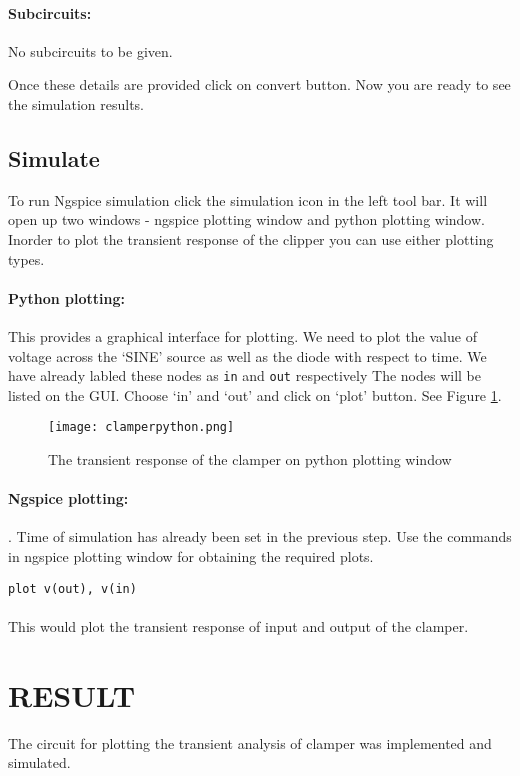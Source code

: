 \paragraph{Subcircuits:} No subcircuits to be given.

\noindent Once these details are provided click on convert button.  Now you are ready to see the simulation results.


\paragraph{}
\subsection*{Simulate} To run Ngspice simulation click the simulation icon in the left tool bar. It will open up two windows - ngspice plotting window and python plotting window. Inorder to plot the transient response of the clipper you can use either plotting types.

\paragraph{Python plotting:}This provides a graphical interface for plotting. We need to plot the value of voltage across the `SINE' source as well as the diode with respect to time. We have already labled these nodes as \texttt{in} and \texttt{out} respectively The nodes will be listed on the GUI. Choose  `in' and `out' and click on `plot' button. See Figure \ref{clamperpython}.

\begin{figure}[h]
\centering
\texttt{[image: clamperpython.png]}
\caption{The transient response of the clamper on python plotting window}
\label{clamperpython}
\end{figure}

\paragraph{Ngspice plotting:}. Time of simulation has already been set in the previous step. Use the commands in ngspice plotting window for obtaining the required plots.

\texttt{plot v(out), v(in) }

\paragraph{}

This would plot the transient response of input and output of the clamper. 


\section*{RESULT}
The circuit for plotting the transient analysis of clamper was implemented and simulated.



